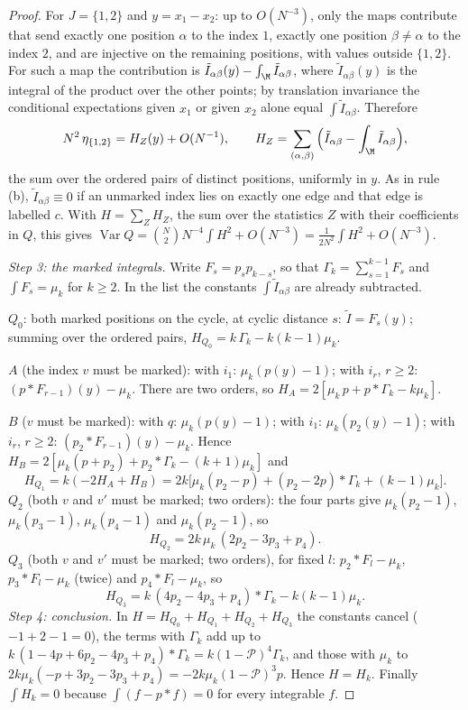 \begin{proof}
For $J=\{1,2\}$ and $y=x_1-x_2$: up to $O(N^{-3})$, only the maps contribute that send exactly one position $\alpha$ to the index $1$, exactly one position $\beta\ne\alpha$ to the index $2$, and are injective on the remaining positions, with values outside $\{1,2\}$. For such a map the contribution is $\tilde I_{\alpha\beta}(y)-\int_\M\tilde I_{\alpha\beta}$, where $\tilde I_{\alpha\beta}(y)$ is the integral of the product over the other points; by translation invariance the conditional expectations given $x_1$ or given $x_2$ alone equal $\int\tilde I_{\alpha\beta}$. Therefore
\begin{equation}\label{eq:var-kernel}
N^2\,\eta_{\{1,2\}}=H_Z(y)+O(N^{-1}),\qquad H_Z=\sum_{(\alpha,\beta)}\Big(\tilde I_{\alpha\beta}-\int_\M\tilde I_{\alpha\beta}\Big),
\end{equation}
the sum over the ordered pairs of distinct positions, uniformly in $y$. As in rule (b), $\tilde I_{\alpha\beta}\equiv0$ if an unmarked index lies on exactly one edge and that edge is labelled $c$. With $H=\sum_ZH_Z$, the sum over the statistics $Z$ with their coefficients in $Q$, this gives $\operatorname{Var}Q=\binom N2N^{-4}\int H^2+O(N^{-3})=\frac1{2N^2}\int H^2+O(N^{-3})$.

\emph{Step 3: the marked integrals.} Write $F_s=p_sp_{k-s}$, so that $\Gamma_k=\sum_{s=1}^{k-1}F_s$ and $\int F_s=\mu_k$ for $k\ge2$. In the list the constants $\int\tilde I_{\alpha\beta}$ are already subtracted.

\smallskip\noindent$Q_0$: both marked positions on the cycle, at cyclic distance $s$: $\tilde I=F_s(y)$; summing over the ordered pairs, $H_{Q_0}=k\,\Gamma_k-k(k-1)\mu_k$.

\noindent$A$ (the index $v$ must be marked): with $i_1$: $\mu_k(p(y)-1)$; with $i_r$, $r\ge2$: $(p*F_{r-1})(y)-\mu_k$. There are two orders, so $H_A=2[\mu_k\,p+p*\Gamma_k-k\mu_k]$.

\noindent$B$ ($v$ must be marked): with $q$: $\mu_k(p(y)-1)$; with $i_1$: $\mu_k(p_2(y)-1)$; with $i_r$, $r\ge2$: $(p_2*F_{r-1})(y)-\mu_k$. Hence $H_B=2[\mu_k(p+p_2)+p_2*\Gamma_k-(k+1)\mu_k]$ and
\[
H_{Q_1}=k(-2H_A+H_B)=2k\big[\mu_k(p_2-p)+(p_2-2p)*\Gamma_k+(k-1)\mu_k\big].
\]
\noindent$Q_2$ (both $v$ and $v'$ must be marked; two orders): the four parts give $\mu_k(p_2-1)$, $\mu_k(p_3-1)$, $\mu_k(p_4-1)$ and $\mu_k(p_2-1)$, so
\[
H_{Q_2}=2k\,\mu_k\,(2p_2-3p_3+p_4).
\]
\noindent$Q_3$ (both $v$ and $v'$ must be marked; two orders), for fixed $l$: $p_2*F_l-\mu_k$, $p_3*F_l-\mu_k$ (twice) and $p_4*F_l-\mu_k$, so
\[
H_{Q_3}=k\,(4p_2-4p_3+p_4)*\Gamma_k-k(k-1)\mu_k .
\]
\emph{Step 4: conclusion.} In $H=H_{Q_0}+H_{Q_1}+H_{Q_2}+H_{Q_3}$ the constants cancel ($-1+2-1=0$), the terms with $\Gamma_k$ add up to $k\,(1-4p+6p_2-4p_3+p_4)*\Gamma_k=k(1-\mathcal P)^4\Gamma_k$, and those with $\mu_k$ to $2k\mu_k(-p+3p_2-3p_3+p_4)=-2k\mu_k(1-\mathcal P)^3p$. Hence $H=H_k$. Finally $\int H_k=0$ because $\int(f-p*f)=0$ for every integrable $f$.
\end{proof}

